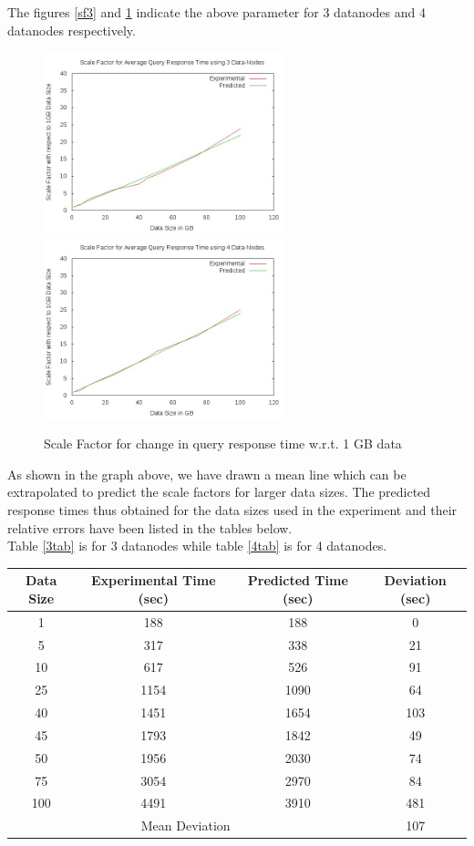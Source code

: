 \documentclass[12pt]{book}
\begin{document}
The figures \ref{sf3} and \ref{sf4} indicate the above parameter for 3 datanodes and 4 datanodes respectively.
\begin{figure}[h]
 \centering
 \subfigure
 {
 \includegraphics[width=7cm]{sf3.jpeg}
 \label{sf3}
 }
 \subfigure
 {
 \includegraphics[width=7cm]{sf4.jpeg}
  \label{sf4}
 }
 \caption{Scale Factor for change in query response time w.r.t. 1 GB data}
\end{figure}

As shown in the graph above, we have drawn a mean line which can be extrapolated to predict the scale factors for larger data sizes.
The predicted response times thus obtained for the data sizes used in the experiment and their relative errors have been listed
in the tables below. \\\noindent
Table \ref{3tab} is for 3 datanodes while table \ref{4tab} is for 4 datanodes.\\
\begin{center}
\label{3tab}
\begin{tabular}{|c|c|c|c|}\hline
Data Size & Experimental Time (sec) & Predicted Time (sec) & Deviation (sec) \\\hline
1 & 188 & 188 & 0\\
5 & 317 & 338 & 21\\
10 & 617 & 526 & 91\\
25 & 1154 & 1090 & 64\\
40 & 1451 & 1654 & 103\\
45 & 1793 & 1842 & 49\\
50 & 1956 & 2030 & 74\\
75 & 3054 & 2970 & 84\\
100 & 4491 & 3910 & 481\\\hline
\multicolumn{3}{|c|}{Mean Deviation} & 107\\\hline
\end{tabular}
\end{center}
\end{document}
